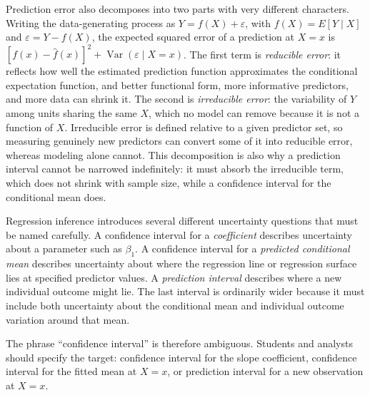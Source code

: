 \documentclass[11pt]{report}
\newcommand{\Var}{\operatorname{Var}}
\begin{document}
Prediction error also decomposes into two parts with very different characters. Writing the data-generating process as \(Y=f(X)+\varepsilon\), with \(f(X)=E[Y\mid X]\) and \(\varepsilon=Y-f(X)\), the expected squared error of a prediction at \(X=x\) is \([f(x)-\widehat{f}(x)]^2+\Var(\varepsilon\mid X=x)\). The first term is \emph{reducible error}: it reflects how well the estimated prediction function approximates the conditional expectation function, and better functional form, more informative predictors, and more data can shrink it. The second is \emph{irreducible error}: the variability of \(Y\) among units sharing the same \(X\), which no model can remove because it is not a function of \(X\). Irreducible error is defined relative to a given predictor set, so measuring genuinely new predictors can convert some of it into reducible error, whereas modeling alone cannot. This decomposition is also why a prediction interval cannot be narrowed indefinitely: it must absorb the irreducible term, which does not shrink with sample size, while a confidence interval for the conditional mean does.

Regression inference introduces several different uncertainty questions that must be named carefully. A confidence interval for a \emph{coefficient} describes uncertainty about a parameter such as \(\beta_1\). A confidence interval for a \emph{predicted conditional mean} describes uncertainty about where the regression line or regression surface lies at specified predictor values. A \emph{prediction interval} describes where a new individual outcome might lie. The last interval is ordinarily wider because it must include both uncertainty about the conditional mean and individual outcome variation around that mean.

The phrase ``confidence interval'' is therefore ambiguous. Students and analysts should specify the target: confidence interval for the slope coefficient, confidence interval for the fitted mean at \(X=x\), or prediction interval for a new observation at \(X=x\).
\end{document}
